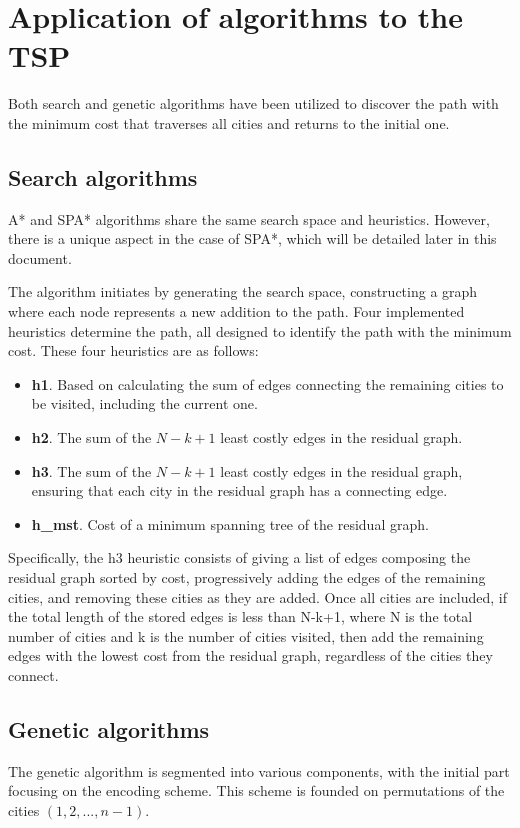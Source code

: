 \documentclass[runningheads]{llncs}
\begin{document}
\section{Application of algorithms to the TSP}
Both search and genetic algorithms have been utilized to discover the path with the minimum cost that traverses all cities and returns to the initial one. 
\subsection{Search algorithms}
A* and SPA* algorithms\cite{stanford-amit} share the same search space and heuristics. However, there is a unique aspect in the case of SPA*, which will be detailed later in this document.

The algorithm initiates by generating the search space, constructing a graph where each node represents a new addition to the path. Four implemented heuristics determine the path, all designed to identify the path with the minimum cost. These four heuristics are as follows:

\begin{itemize}
    \item \textbf{h1}. Based on calculating the sum of edges connecting the remaining cities to be visited, including the current one.
    \item \textbf{h2}. The sum of the $N-k+1$ least costly edges in the residual graph.
    \item \textbf{h3}. The sum of the $N-k+1$ least costly edges in the residual graph, ensuring that each city in the residual graph has a connecting edge.
    \item \textbf{h\_mst}. Cost of a minimum spanning tree of the residual graph.
\end{itemize}   

Specifically, the h3 heuristic consists of giving a list of edges composing the residual graph sorted by cost, progressively adding the edges of the remaining cities, and removing these cities as they are added. Once all cities are included, if the total length of the stored edges is less than N-k+1, where N is the total number of cities and k is the number of cities visited, then add the remaining edges with the lowest cost from the residual graph, regardless of the cities they connect.

\subsection{Genetic algorithms}
The genetic algorithm is segmented into various components, with the initial part focusing on the encoding scheme. This scheme is founded on permutations of the cities $(1, 2,...,n-1)$. 
\end{document}
